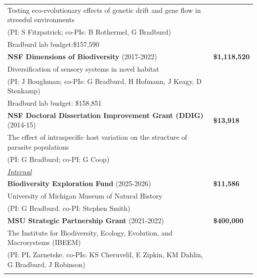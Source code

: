\documentclass{gbcv}
\newif\ifpm
\begin{document}
\begin{longtable}{>{\everypar{\dohang}\dohang\raggedright\arraybackslash}p{}p{}}
\hspace{4.5mm} Testing eco-evolutionary effects of genetic drift and gene flow in stressful environments\\
\hspace{4.5mm}(PI: S Fitzpatrick; co-PIs: B Rothermel, G Bradburd\ifpm \,(5\%)\fi)\\
\hspace{4.5mm}Bradburd lab budget:\$157,590 \vspace{0.2cm}\\ 
%
\pagebreak
%
\textbf{NSF Dimensions of Biodiversity} (2017-2022) & \hfill \textbf{\$1,118,520} \\
\hspace{4.5mm}Diversification of sensory systems in novel habitat\\
\hspace{4.5mm}(PI: J Boughman; co-PIs: G Bradburd, H Hofmann, J Keagy, D Stenkamp)\\ 
\hspace{4.5mm}Bradburd lab budget: \$158,851 \vspace{0.2cm}\\
%
\textbf{NSF Doctoral Dissertation Improvement Grant (DDIG)} (2014-15) & \hfill \textbf{\$13,918}\\
\hspace{4.5mm}The effect of intraspecific host variation on the structure of parasite populations\\
\hspace{4.5mm}(PI: G Bradburd; co-PI: G Coop)\\ \vspace{-0.1cm}

\textit{\underline{Internal}}\\\vspace{-0.25cm}

\textbf{Biodiversity Exploration Fund} (2025-2026) & \hfill \textbf{\$11,586}\\
\hspace{4.5mm}University of Michigan Museum of Natural History\\
\hspace{4.5mm}(PI: G Bradburd. co-PI: Stephen Smith)\\ \vspace{-0.1cm}

\textbf{MSU Strategic Partnership Grant} (2021-2022) & \hfill \textbf{\$400,000}\\
\hspace{4.5mm}The Institute for Biodiversity, Ecology, Evolution, and Macrosystems (IBEEM)\\
\hspace{4.5mm}(PI: PL Zarnetske. co-PIs: KS Cheruvelil, E Zipkin, KM Dahlin, G Bradburd, J Robinson)\\ \vspace{-0.1cm}


\end{longtable}
\end{document}
